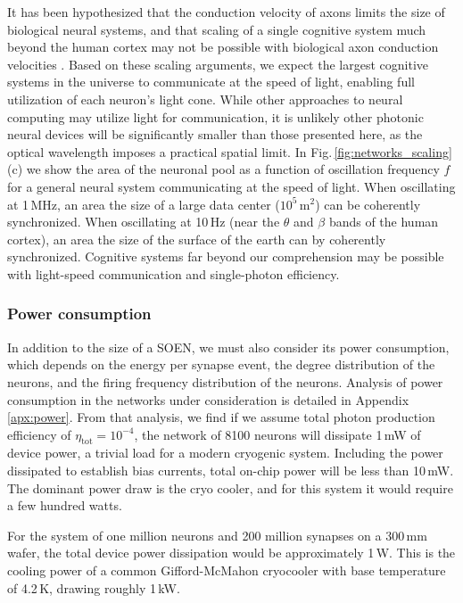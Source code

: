 \documentclass[twocolumn]{article}
\begin{document}
It has been hypothesized that the conduction velocity of axons limits the size of biological neural systems, and that scaling of a single cognitive system much beyond the human cortex may not be possible with biological axon conduction velocities \cite{rido1994,bu2006}. Based on these scaling arguments, we expect the largest cognitive systems in the universe to communicate at the speed of light, enabling full utilization of each neuron's light cone. While other approaches to neural computing may utilize light for communication, it is unlikely other photonic neural devices will be significantly smaller than those presented here, as the optical wavelength imposes a practical spatial limit. In Fig.\,\ref{fig:networks_scaling}(c) we show the area of the neuronal pool as a function of oscillation frequency $f$ for a general neural system communicating at the speed of light. When oscillating at 1\,MHz, an area the size of a large data center ($10^5$\,m$^2$) can be coherently synchronized. When oscillating at 10\,Hz (near the $\theta$ and $\beta$ bands of the human cortex), an area the size of the surface of the earth can by coherently synchronized. Cognitive systems far beyond our comprehension may be possible with light-speed communication and single-photon efficiency.

\subsubsection{Power consumption}
In addition to the size of a SOEN, we must also consider its power consumption, which depends on the energy per synapse event, the degree distribution of the neurons, and the firing frequency distribution of the neurons. Analysis of power consumption in the networks under consideration is detailed in Appendix \ref{apx:power}. From that analysis, we find if we assume total photon production efficiency of $\eta_{\mathrm{tot}} = 10^{-4}$, the network of 8100 neurons will dissipate 1\,mW of device power, a trivial load for a modern cryogenic system. Including the power dissipated to establish bias currents, total on-chip power will be less than 10\,mW. The dominant power draw is the cryo cooler, and for this system it would require a few hundred watts.

For the system of one million neurons and 200 million synapses on a 300\,mm wafer, the total device power dissipation would be approximately 1\,W. This is the cooling power of a common Gifford-McMahon cryocooler with base temperature of 4.2\,K, drawing roughly 1\,kW. 
\end{document}
